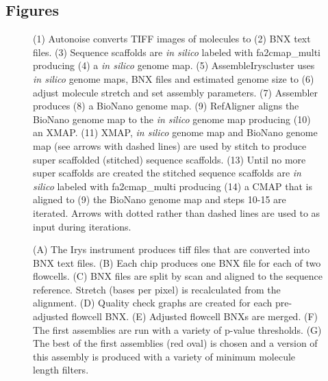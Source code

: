 \documentclass{bmcart}
\begin{document}
\begin{backmatter}

\section*{Figures}
  \begin{figure}[h!]
  	\caption{
  		(1) Autonoise converts TIFF images of molecules to (2) BNX text files. (3) Sequence scaffolds are \textit{in silico} labeled with fa2cmap\_multi producing (4) a \textit{in silico} genome map. (5) AssembleIryscluster uses \textit{in silico} genome maps, BNX files and estimated genome size to (6) adjust molecule stretch and set assembly parameters. (7) Assembler produces (8) a BioNano genome map. (9) RefAligner aligns the BioNano genome map to the \textit{in silico} genome map producing (10) an XMAP. (11) XMAP, \textit{in silico} genome map and BioNano genome map (see arrows with dashed lines) are used by stitch to produce super scaffolded (stitched) sequence scaffolds. (13) Until no more super scaffolds are created the stitched sequence scaffolds are \textit{in silico} labeled with fa2cmap\_multi producing (14) a CMAP that is aligned to (9) the BioNano genome map and steps 10-15 are iterated. Arrows with dotted rather than dashed lines are used to as input during iterations.}
  \end{figure}
  \begin{figure}[h!]
  	\caption{
  		(A) The Irys instrument produces tiff files that are converted into BNX text files. (B) Each chip produces one BNX file for each of two flowcells. (C) BNX files are split by scan and aligned to the sequence reference. Stretch (bases per pixel) is recalculated from the alignment. (D) Quality check graphs are created for each pre-adjusted flowcell BNX. (E) Adjusted flowcell BNXs are merged. (F) The first assemblies are run with a variety of p-value thresholds. (G) The best of the first assemblies (red oval) is chosen and a version of this assembly is produced with a variety of minimum molecule length filters.}
  \end{figure}
  \begin{figure}[h!]
  \caption{
}
\end{figure}
\end{backmatter}
\end{document}
